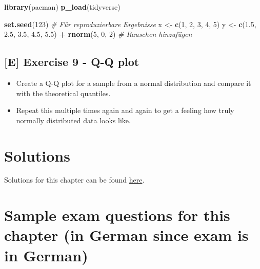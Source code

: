 \documentclass[
]{book}
\newenvironment{Shaded}{\begin{snugshade}}{\end{snugshade}}
\newcommand{\CommentTok}[1]{\textcolor[rgb]{0.56,0.35,0.01}{\textit{#1}}}
\newcommand{\DecValTok}[1]{\textcolor[rgb]{0.00,0.00,0.81}{#1}}
\newcommand{\FloatTok}[1]{\textcolor[rgb]{0.00,0.00,0.81}{#1}}
\newcommand{\FunctionTok}[1]{\textcolor[rgb]{0.13,0.29,0.53}{\textbf{#1}}}
\newcommand{\NormalTok}[1]{#1}
\newcommand{\OtherTok}[1]{\textcolor[rgb]{0.56,0.35,0.01}{#1}}
\newcommand{\SpecialCharTok}[1]{\textcolor[rgb]{0.81,0.36,0.00}{\textbf{#1}}}
\providecommand{\tightlist}{%
  \setlength{\itemsep}{0pt}\setlength{\parskip}{0pt}}
\begin{document}
\begin{Shaded}
\begin{Highlighting}[]
\FunctionTok{library}\NormalTok{(pacman)}
\FunctionTok{p\_load}\NormalTok{(tidyverse)}

\FunctionTok{set.seed}\NormalTok{(}\DecValTok{123}\NormalTok{) }\CommentTok{\# Für reproduzierbare Ergebnisse}
\NormalTok{x }\OtherTok{\textless{}{-}} \FunctionTok{c}\NormalTok{(}\DecValTok{1}\NormalTok{, }\DecValTok{2}\NormalTok{, }\DecValTok{3}\NormalTok{, }\DecValTok{4}\NormalTok{, }\DecValTok{5}\NormalTok{)}
\NormalTok{y }\OtherTok{\textless{}{-}} \FunctionTok{c}\NormalTok{(}\FloatTok{1.5}\NormalTok{, }\FloatTok{2.5}\NormalTok{, }\FloatTok{3.5}\NormalTok{, }\FloatTok{4.5}\NormalTok{, }\FloatTok{5.5}\NormalTok{) }\SpecialCharTok{+} \FunctionTok{rnorm}\NormalTok{(}\DecValTok{5}\NormalTok{, }\DecValTok{0}\NormalTok{, }\DecValTok{2}\NormalTok{) }\CommentTok{\# Rauschen hinzufügen}
\end{Highlighting}
\end{Shaded}

\subsection{{[}E{]} Exercise 9 - Q-Q plot}\label{exercise9_descriptive_stats}

\begin{itemize}
\tightlist
\item
  Create a Q-Q plot for a sample from a normal distribution and compare it with the theoretical quantiles.
\item
  Repeat this multiple times again and again to get a feeling how truly normally distributed data looks like.
\end{itemize}

\section{Solutions}\label{solutions-1}

Solutions for this chapter can be found \href{https://github.com/jdegenfellner/Script_QM1_ZHAW/tree/main/Solutions_to_Exercises/3_Descriptive_statistics}{here}.

\section{Sample exam questions for this chapter (in German since exam is in German)}\label{sample-exam-questions-for-this-chapter-in-german-since-exam-is-in-german-1}
\end{document}
